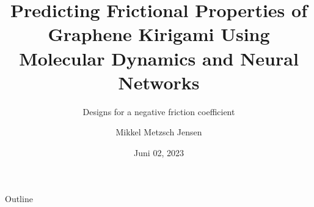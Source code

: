 \documentclass[
	10pt, %
]{beamer}
\title[Predicting Graphene Kirigami Friction]{Predicting Frictional Properties of Graphene Kirigami Using Molecular Dynamics and Neural Networks}
\subtitle{Designs for a negative friction coefficient}
\author[Mikkel Metzsch Jensen]{Mikkel Metzsch Jensen}
\institute[UiO]{University of Oslo}
\date[Juni 02, 2023]{Juni 02, 2023}
\begin{document}

\begin{frame}
	\titlepage %
\end{frame}


\begin{frame}{Outline}
    \tableofcontents
\end{frame}
%
%
\end{document}

